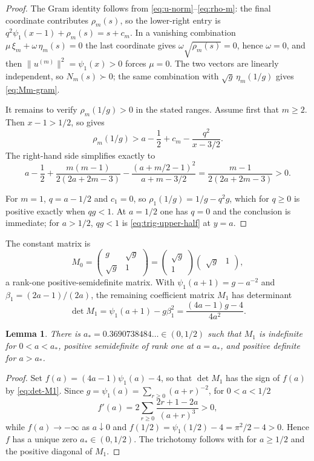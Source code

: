 \documentclass[11pt,a4paper]{amsart}
\numberwithin{equation}{section}
\theoremstyle{plain}
\newtheorem{lemma}[theorem]{Lemma}
\theoremstyle{definition}
\begin{document}
\begin{proof}
The Gram identity follows from \eqref{eq:u-norm}--\eqref{eq:rho-m}: the final coordinate contributes \(\rho_m(s)\), so the lower-right entry is \(q^2\psi_1(x-1)+\rho_m(s)=s+c_m\).  In a vanishing combination \(\mu\,\xi_m+\omega\,\eta_m(s)=0\) the last coordinate gives \(\omega\sqrt{\rho_m(s)}=0\), hence \(\omega=0\), and then \(\|u^{(m)}\|^2=\psi_1(x)>0\) forces \(\mu=0\).  The two vectors are linearly independent, so \(N_m(s)\succ0\); the same combination with \(\sqrt g\,\eta_m(1/g)\) gives \eqref{eq:Mm-gram}.

It remains to verify \(\rho_m(1/g)>0\) in the stated ranges.  Assume first that \(m\ge2\).  Then \(x-1>1/2\), so  gives
\[
 \rho_m(1/g)>
 a-\frac12+c_m-\frac{q^2}{x-3/2}.
\]
The right-hand side simplifies exactly to
\[
 a-\frac12+\frac{m(m-1)}{2(2a+2m-3)}
 -\frac{(a+m/2-1)^2}{a+m-3/2}
 =\frac{m-1}{2(2a+2m-3)}>0.
\]

For \(m=1\), \(q=a-1/2\) and \(c_1=0\), so \(\rho_1(1/g)=1/g-q^2g\), which for
\(q\ge0\) is positive exactly when \(qg<1\).  At \(a=1/2\) one has \(q=0\) and
the conclusion is immediate; for \(a>1/2\), \(qg<1\) is
\eqref{eq:trig-upper-half} at \(y=a\).
\end{proof}


The constant matrix is
\[
 M_0=
 \begin{pmatrix}g&\sqrt g\\ \sqrt g&1\end{pmatrix}
 =\begin{pmatrix}\sqrt g\\1\end{pmatrix}
 \begin{pmatrix}\sqrt g&1\end{pmatrix},
\]
a rank-one positive-semidefinite matrix.  With \(\psi_1(a+1)=g-a^{-2}\) and \(\beta_1=(2a-1)/(2a)\), the remaining coefficient matrix \(M_1\) has determinant
\begin{equation}\label{eq:det-M1}
 \det M_1
 =\psi_1(a+1)-g\beta_1^2
 =\frac{(4a-1)g-4}{4a^2}.
\end{equation}

\begin{lemma}\label{lem:M1-indefinite}
There is \(a_*=0.3690738484\ldots\in(0,1/2)\) such that \(M_1\) is indefinite for
\(0<a<a_*\), positive semidefinite of rank one at \(a=a_*\), and positive definite
for \(a>a_*\).
\end{lemma}

\begin{proof}
Set \(f(a)=(4a-1)\psi_1(a)-4\), so that \(\det M_1\) has the sign of \(f(a)\) by \eqref{eq:det-M1}.  Since \(g=\psi_1(a)=\sum_{r\ge0}(a+r)^{-2}\), for \(0<a<1/2\)
\[
 f'(a)=2\sum_{r\ge0}\frac{2r+1-2a}{(a+r)^3}>0,
\]
while \(f(a)\to-\infty\) as \(a\downarrow0\) and \(f(1/2)=\psi_1(1/2)-4=\pi^2/2-4>0\).  Hence \(f\) has a unique zero \(a_*\in(0,1/2)\).  The trichotomy follows with  for \(a\ge1/2\) and the positive diagonal of \(M_1\).
\end{proof}
\end{document}
